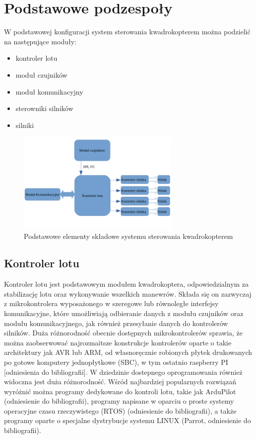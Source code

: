 \section{Podstawowe podzespoły}

W podstawowej konfiguracji system sterowania kwadrokopterem można podzielić na następujące moduły:
\begin{itemize}
	\item{kontroler lotu}
	\item{moduł czujników}
	\item{moduł komunikacyjny}
	\item{sterowniki silników}
	\item{silniki}
\end{itemize}

\begin{figure}[H]
	\centering
		\includegraphics[width=0.7\textwidth]{Pictures/quadrotor_modules.png}
	\caption[Podstawowe moduły kwawdrokoptera]{Podstawowe elementy składowe systemu sterowania kwadrokopterem}
	\label{fig:quadrotor_modules.png}
\end{figure}

\subsection{Kontroler lotu}

Kontroler lotu jest podstawowym modułem kwadrokoptera, odpowiedzialnym za stabilizację lotu oraz wykonywanie wszelkich manewrów. Składa się on zazwyczaj z mikrokontrolera wyposażonego w szeregowe lub równoległe interfejsy komunikacyjne, które umożliwiają odbieranie danych z modułu czujników oraz modułu komunikacyjnego, jak również przesyłanie danych do kontrolerów silników. Duża różnorodność obecnie dostępnych mikrokontrolerów sprawia, że można zaobserwować najrozmaitsze konstrukcje kontrolerów oparte o takie architektury jak AVR lub ARM, od własnoręcznie robionych płytek drukowanych po gotowe komputery jednopłytkowe (SBC), w tym ostatnio raspberry PI [odniesienia do bibliografii]. W dziedzinie dostepnego oprogramowania również widoczna jest duża różnorodność. Wśród najbardziej popularnych rozwiązań wyróżnić można programy dedykowane do kontroli lotu, takie jak ArduPilot (odniesienie do bibliografii), programy napisane w oparciu o proste systemy operacyjne czasu rzeczywistego (RTOS) (odniesienie do bibliografii), a także programy oparte o specjalne dystrybucje systemu LINUX (Parrot, odniesienie do bibliografii).


